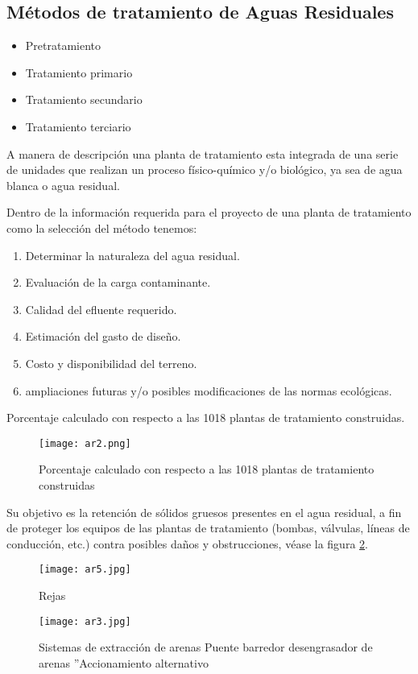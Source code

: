 \subsection{Métodos de tratamiento de Aguas Residuales}
\begin{itemize}
    \item Pretratamiento
    \item Tratamiento primario
    \item Tratamiento secundario
    \item Tratamiento terciario
\end{itemize}
\begin{definition}
    A manera de descripción una planta de tratamiento esta integrada de una serie de unidades que realizan un proceso físico-químico y/o biológico, ya sea de agua blanca o agua residual.
\end{definition}
Dentro de la información requerida para el proyecto de una planta de tratamiento como la selección del método tenemos:
\begin{enumerate}
    \item Determinar la naturaleza del agua residual.
	\item Evaluación de la carga contaminante.
	\item Calidad del efluente requerido.
	\item Estimación del gasto de diseño.
	\item Costo y disponibilidad del terreno.
	\item ampliaciones futuras y/o posibles modificaciones de las normas ecológicas.
\end{enumerate}

Porcentaje calculado con respecto a las 1018 plantas de tratamiento construidas.
\begin{figure}[h!]
\centering
  \texttt{[image: ar2.png]}
  \caption{Porcentaje calculado con respecto a las 1018 plantas de tratamiento construidas}
  \label{ar2}
\end{figure}
\begin{definition}[Rejas]
    Su objetivo es la retención de sólidos gruesos presentes en el agua residual, a fin de proteger los equipos de las plantas de tratamiento (bombas, válvulas, líneas de conducción, etc.) contra posibles daños y obstrucciones, véase la figura \ref{ar5}.
\end{definition}
\begin{figure}[h!]
\centering
  \texttt{[image: ar5.jpg]}
  \caption{Rejas}
  \label{ar5}
\end{figure}
\begin{figure}[h!]
\centering
  \texttt{[image: ar3.jpg]}
  \caption{Sistemas de extracción de arenas Puente barredor desengrasador de arenas ''Accionamiento alternativo}
  \label{ar3}
\end{figure}

